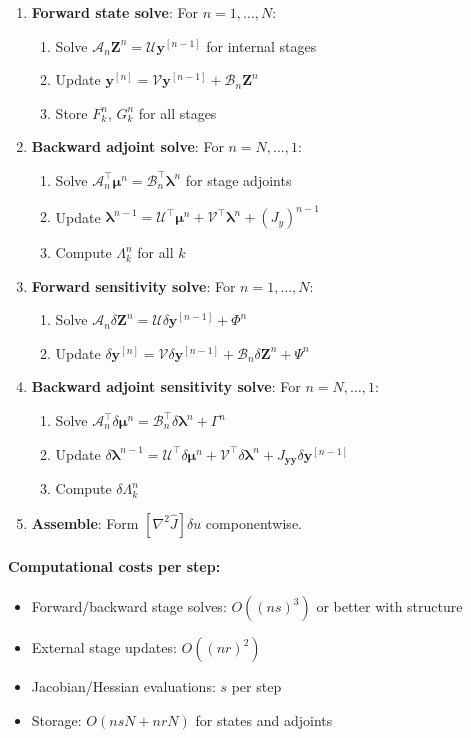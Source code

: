 \documentclass[11pt]{article}
\newcommand{\tp}{^\top}
\newcommand{\Zv}{\mathbf{Z}}
\newcommand{\yv}{\mathbf{y}}
\newcommand{\lv}{\boldsymbol{\lambda}}
\newcommand{\mv}{\boldsymbol{\mu}}
\newcommand{\Av}{\mathcal{A}}
\newcommand{\Bv}{\mathcal{B}}
\newcommand{\Uv}{\mathcal{U}}
\newcommand{\Vv}{\mathcal{V}}
\begin{document}
\begin{enumerate}
\item \textbf{Forward state solve}: For $n = 1, \ldots, N$:
\begin{enumerate}
\item Solve $\Av_n \Zv^n = \Uv\yv^{[n-1]}$ for internal stages
\item Update $\yv^{[n]} = \Vv\yv^{[n-1]} + \Bv_n\Zv^n$
\item Store $F_k^n$, $G_k^n$ for all stages
\end{enumerate}

\item \textbf{Backward adjoint solve}: For $n = N, \ldots, 1$:
\begin{enumerate}
\item Solve $\Av_n\tp \mv^n = \Bv_n\tp \lv^n$ for stage adjoints
\item Update $\lv^{n-1} = \Uv\tp\mv^n + \Vv\tp\lv^n + (J_y)^{n-1}$
\item Compute $\Lambda_k^n$ for all $k$
\end{enumerate}

\item \textbf{Forward sensitivity solve}: For $n = 1, \ldots, N$:
\begin{enumerate}
\item Solve $\Av_n\delta\Zv^n = \Uv\delta\yv^{[n-1]} + \Phi^n$
\item Update $\delta\yv^{[n]} = \Vv\delta\yv^{[n-1]} + \Bv_n\delta\Zv^n + \Psi^n$
\end{enumerate}

\item \textbf{Backward adjoint sensitivity solve}: For $n = N, \ldots, 1$:
\begin{enumerate}
\item Solve $\Av_n\tp\delta\mv^n = \Bv_n\tp\delta\lv^n + \Gamma^n$
\item Update $\delta\lv^{n-1} = \Uv\tp\delta\mv^n + \Vv\tp\delta\lv^n + J_{\yv\yv}\delta\yv^{[n-1]}$
\item Compute $\delta\Lambda_k^n$
\end{enumerate}

\item \textbf{Assemble}: Form $[\nabla^2\hat{J}]\delta u$ componentwise.
\end{enumerate}

\paragraph{Computational costs per step:}
\begin{itemize}
\item Forward/backward stage solves: $O((ns)^3)$ or better with structure
\item External stage updates: $O((nr)^2)$
\item Jacobian/Hessian evaluations: $s$ per step
\item Storage: $O(nsN + nrN)$ for states and adjoints
\end{itemize}
\end{document}

